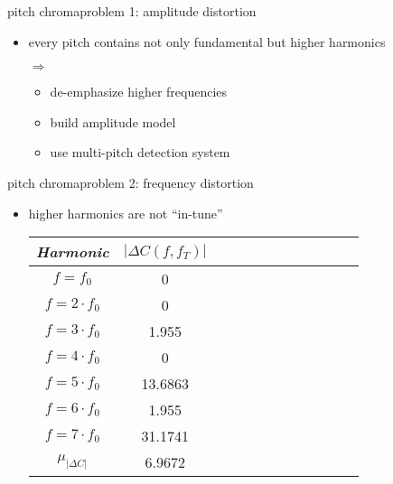         \begin{frame}{pitch chroma}{problem 1: amplitude distortion}
            \vspace{-3mm}
            \begin{itemize}
                \item	every pitch contains not only fundamental but higher harmonics
                \item[$\Rightarrow$]
                    \begin{itemize}
                        \item<2->	[$\Rightarrow$]	de-emphasize higher frequencies
                        \item<2->	[$\Rightarrow$]	build amplitude model
                        \item<2->	[$\Rightarrow$]	use multi-pitch detection system
                    \end{itemize}
            \end{itemize}
        \end{frame}
        \begin{frame}{pitch chroma}{problem 2: frequency distortion}
            \begin{itemize}
                \item	higher harmonics are not ``in-tune''
                \begin{table}
                    \centering
                    \begin{tabular}{cccccccccccc} %
                        \\ \hline
                        \bf{\emph{Harmonic}}	 & \bf{\emph{$|\Delta C(f,f_T)|$}}\\ 
                         \hline
                        \bf{$f = f_0$}	 & 0\\
                        \bf{$f = 2\cdot f_0$}	 & 0\\
                        \bf{$f = 3\cdot f_0$}	 & 1.955\\
                        \bf{$f = 4\cdot f_0$}	 & 0\\
                        \bf{$f = 5\cdot f_0$}	 & 13.6863\\
                        \bf{$f = 6\cdot f_0$}	 & 1.955\\
                        \bf{$f = 7\cdot f_0$}	 & 31.1741\\
                        \hline
                        \bf{$\mu_{|\Delta C|}$}	 & 6.9672\\
                    \end{tabular}
                \end{table}
            \end{itemize}
        \end{frame}

